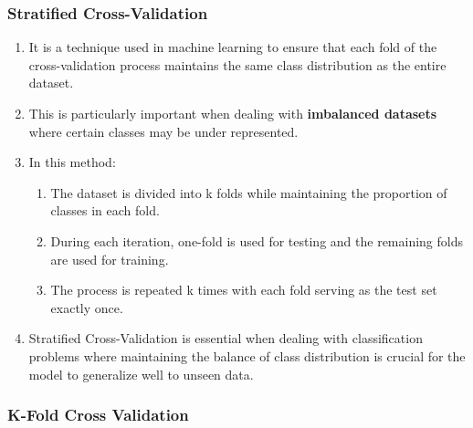 \subsubsection{Stratified Cross-Validation}

\begin{enumerate}
    \item It is a technique used in machine learning to ensure that each fold of the cross-validation process maintains the same class distribution as the entire dataset. 
    \hfill \cite{geeksforgeeks/machine-learning/cross-validation-machine-learning}
    
    \item This is particularly important when dealing with \textbf{imbalanced datasets} where certain classes may be under represented. 
    \hfill \cite{geeksforgeeks/machine-learning/cross-validation-machine-learning}
    
    \item In this method:
    \begin{enumerate}
        \item The dataset is divided into k folds while maintaining the proportion of classes in each fold.
        \hfill \cite{geeksforgeeks/machine-learning/cross-validation-machine-learning}
        
        \item During each iteration, one-fold is used for testing and the remaining folds are used for training.
        \hfill \cite{geeksforgeeks/machine-learning/cross-validation-machine-learning}
        
        \item The process is repeated k times with each fold serving as the test set exactly once.
        \hfill \cite{geeksforgeeks/machine-learning/cross-validation-machine-learning}
    \end{enumerate}

    \item Stratified Cross-Validation is essential when dealing with classification problems where maintaining the balance of class distribution is crucial for the model to generalize well to unseen data.
    \hfill \cite{geeksforgeeks/machine-learning/cross-validation-machine-learning}
\end{enumerate}


\subsubsection{K-Fold Cross Validation }

